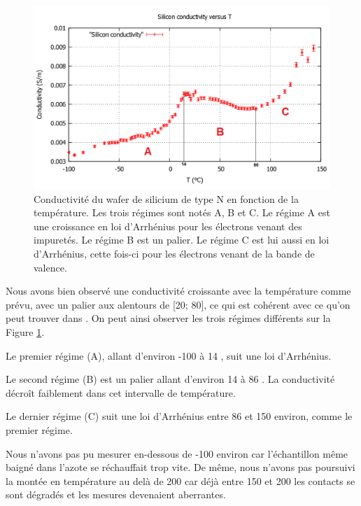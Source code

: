 \begin{figure}[hb]
  \begin{center}
		\includegraphics[width=12cm]{./images/Conductivite_Silicium_finale_english.png}
		\caption{Conductivité du wafer de silicium de type N en fonction de la température. Les trois régimes sont notés A, B et C. Le régime A est une croissance en loi d'Arrhénius pour les électrons venant des impuretés. Le régime B est un palier. Le régime C est lui aussi en loi d'Arrhénius, cette fois-ci pour les électrons venant de la bande de valence.}
		\label{courbe_silicium}
	\end{center}
\end{figure}

\newpage

Nous avons bien observé une conductivité croissante avec la température comme prévu, avec un palier aux alentours de [20\celsius{}; 80\celsius{}], ce qui est cohérent avec ce qu'on peut trouver dans \cite{kittel_introduction_1976}. On peut ainsi observer les trois régimes différents sur la Figure \ref{courbe_silicium}.

Le premier régime (A), allant d'environ -100 \celsius{} à 14 \celsius{}, suit une loi d'Arrhénius.

Le second régime (B) est un palier allant d'environ 14 \celsius{} à 86 \celsius{}. La conductivité décroît faiblement dans cet intervalle de température.

Le dernier régime (C) suit une loi d'Arrhénius entre 86 \celsius{} et 150 \celsius{} environ, comme le premier régime.

Nous n'avons pas pu mesurer en-dessous de -100 \celsius{} environ car l'échantillon même baigné dans l'azote se réchauffait trop vite. De même, nous n'avons pas poursuivi la montée en température au delà de 200 \celsius{} car déjà entre 150 \celsius{} et 200 \celsius{} les contacts se sont dégradés et les mesures devenaient aberrantes.

